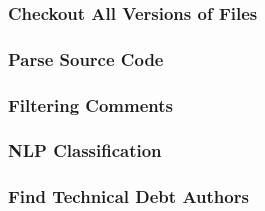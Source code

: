 \subsubsection*{Checkout All Versions of Files}
\label{subsub:checkout_all_versions_of_files}

\subsubsection*{Parse Source Code}
\label{subsub:parse_source_code}

\subsubsection*{Filtering Comments}
\label{subsub:filtering_comments}

\subsubsection*{NLP Classification}
\label{subsub:nlp_classification}

\subsubsection*{Find Technical Debt Authors}
\label{subsub:find_technical_debt_authors}


